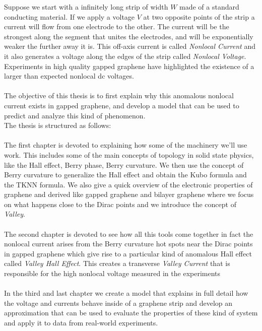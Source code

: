 Suppose we start with a infinitely long strip of width $W$ made of a standard conducting material. If we apply a voltage $V$ at two opposite points of the strip a current will flow from one electrode to the other. The current will be the strongest along the segment that unites the electrodes, and will be exponentially weaker the further away it is. This off-axis current is called \textit{Nonlocal Current} and it also generates a voltage along the edges of the strip called \textit{Nonlocal Voltage}.\\
Experiments in high quality gapped graphene have highlighted the existence of a larger than expected nonlocal dc voltages.\\\\
The objective of this thesis is to first explain why this anomalous nonlocal current exists in gapped graphene, and develop a model that can be used to predict and analyze this kind of phenomenon.\\
The thesis is structured as follows:\\\\
The first chapter is devoted to explaining how some of the machinery we'll use work. This includes some of the main concepts of topology in solid state physics, like the Hall effect, Berry phase, Berry curvature. We then use the concept of Berry curvature to generalize the Hall effect and obtain the Kubo formula and the TKNN formula. We also give a quick overview of the electronic properties of graphene and derived like gapped graphene and bilayer graphene where we focus on what happens close to the Dirac points and we introduce the concept of \textit{Valley}.\\\\
The second chapter is devoted to see how all this tools come together in fact the nonlocal current arises from the Berry curvature hot spots near the Dirac points in gapped graphene which give rise to a particular kind of anomalous Hall effect called \textit{Valley Hall Effect}. This creates a transverse \textit{Valley Current} that is responsible for the high nonlocal voltage measured in the experiments\\\\
In the third and last chapter we create a model that explains in full detail how the voltage and currents behave inside of a graphene strip and develop an approximation that can be used to evaluate the properties of these kind of system and apply it to data from real-world experiments.